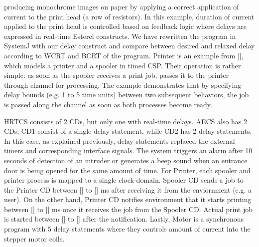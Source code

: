 producing monochrome images on paper by applying a correct application
of current to the print head (a row of resistors). In this example,
duration of current applied to the print head is controlled based on
feedback logic where delays are expressed in real-time Esterel
constructs. We have rewritten the program in SystemJ with our delay
construct and compare between desired and relaxed delay according to
WCRT and BCRT of the program. Printer is an example from [], which
models a printer and a spooler in timed CSP. Their operation is rather
simple: as soon as the spooler receives a print job, passes it to the
printer through channel for processing. The example demonstrates that by
specifying delay bounds (e.g. 1 to 5 time units) between two subsequent
behaviors, the job is passed along the channel as soon as both processes
become ready.


HRTCS consists of 2 CDs, but only one with real-time delays. AECS also
has 2 CDs; CD1 consist of a single delay statement, while CD2 has 2
delay statements. In this case, as explained previously, delay
statements replaced the external timers and corresponding interface
signals. The system triggers an alarm after 10 seconds of detection of
an intruder or generates a beep sound when an entrance door is being
opened for the same amount of time. For Printer, each spooler and
printer process is mapped to a single clock-domain. Spooler CD sends a
job to the Printer CD between [] to [] ms after receiving it from the
enviornment (e.g. a user). On the other hand, Printer CD notifies
environment that it starts printing between [] to [] ms once it receives
the job from the Spooler CD. Actual print job is started between [] to
[] after the notification. Lastly, Motor is a synchronous program with 5
delay statements where they controls amount of current into the stepper
motor coils. 




